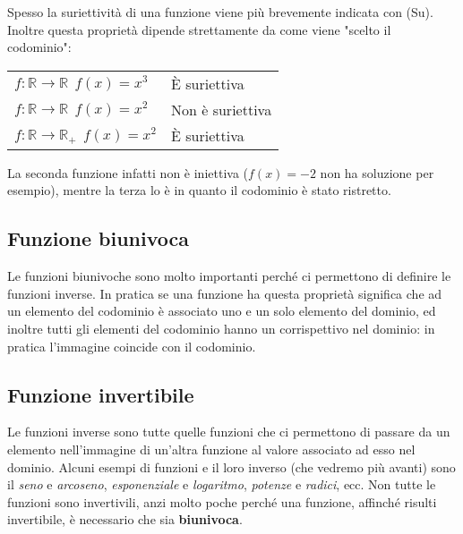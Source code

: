 Spesso la suriettività di una funzione viene più brevemente indicata con (Su). Inoltre questa proprietà dipende strettamente da come viene "scelto il codominio":

\begin{table}[H]
\centering
\begin{tabular}{ll}
$f: \mathbb{R} \to \mathbb{R}\;\, f(x) = x^3$          & È suriettiva      \\
$f: \mathbb{R} \to \mathbb{R}\;\, f(x) = x^2$        & Non è suriettiva  \\
$f: \mathbb{R} \to \mathbb{R}_{+}\;\, f(x) = x^2$ & È suriettiva     
\end{tabular}
\end{table}

La seconda funzione infatti non è iniettiva ($f(x) = -2$ non ha soluzione per esempio), mentre la terza lo è in quanto il codominio è stato ristretto.

\subsection{Funzione biunivoca}

Le funzioni biunivoche sono molto importanti perché ci permettono di definire le funzioni inverse. In pratica se una funzione ha questa proprietà significa che ad un elemento del codominio è associato uno e un solo elemento del dominio, ed inoltre tutti gli elementi del codominio hanno un corrispettivo nel dominio: in pratica l'immagine coincide con il codominio.

\subsection{Funzione invertibile}
Le funzioni inverse sono tutte quelle funzioni che ci permettono di passare da un elemento nell'immagine di un'altra funzione al valore associato ad esso nel dominio. Alcuni esempi di funzioni e il loro inverso (che vedremo più avanti) sono il \textit{seno} e \textit{arcoseno}, \textit{esponenziale} e \textit{logaritmo}, \textit{potenze} e \textit{radici}, ecc. Non tutte le funzioni sono invertivili, anzi molto poche perché una funzione, affinché risulti invertibile, è necessario che sia \textbf{biunivoca}.


